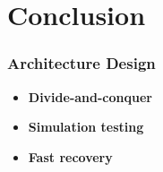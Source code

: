 \section{Conclusion}

\begin{frame}
    \frametitle{Architecture Design}
    \begin{itemize}
        \item \textbf{Divide-and-conquer}
        \item \textbf{Simulation testing}
        \item \textbf{Fast recovery}
    \end{itemize}
\end{frame}
